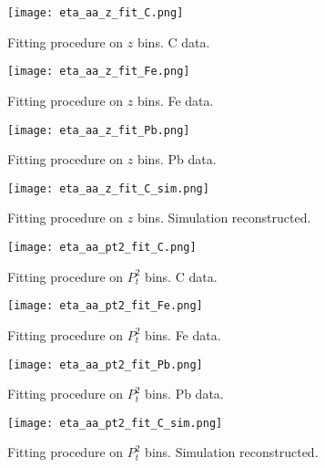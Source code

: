 \begin{landscape}
\begin{figure}[H]
\centering
\texttt{[image: eta\_aa\_z\_fit\_C.png]}
\caption{Fitting procedure on $z$ bins. C data.}
\label{fig:eta_aa_z_fit_C}
\end{figure}

%
\begin{figure}[H]
\centering
\texttt{[image: eta\_aa\_z\_fit\_Fe.png]}
\caption{Fitting procedure on $z$ bins. Fe data.}
\label{fig:eta_aa_z_fit_Fe}
\end{figure}
%
\begin{figure}[H]
\centering
\texttt{[image: eta\_aa\_z\_fit\_Pb.png]}
\caption{Fitting procedure on $z$ bins. Pb data.}
\label{fig:eta_aa_z_fit_Pb}
\end{figure}
%
\begin{figure}[H]
\centering
\texttt{[image: eta\_aa\_z\_fit\_C\_sim.png]}
\caption{Fitting procedure on $z$ bins. Simulation reconstructed.}
\label{fig:eta_aa_z_fit_sim}
\end{figure}


\begin{figure}[H]
\centering
\texttt{[image: eta\_aa\_pt2\_fit\_C.png]}
\caption{Fitting procedure on $P_t^2$ bins. C data.}
\label{fig:eta_aa_pt2_fit_C}
\end{figure}

%
\begin{figure}[H]
\centering
\texttt{[image: eta\_aa\_pt2\_fit\_Fe.png]}
\caption{Fitting procedure on $P_t^2$ bins. Fe data.}
\label{fig:eta_aa_pt2_fit_Fe}
\end{figure}
%
\begin{figure}[H]
\centering
\texttt{[image: eta\_aa\_pt2\_fit\_Pb.png]}
\caption{Fitting procedure on $P_t^2$ bins. Pb data.}
\label{fig:eta_aa_pt2_fit_Pb}
\end{figure}
%
\begin{figure}[H]
\centering
\texttt{[image: eta\_aa\_pt2\_fit\_C\_sim.png]}
\caption{Fitting procedure on $P_t^2$ bins. Simulation reconstructed.}
\label{fig:eta_aa_pt2_fit_sim}
\end{figure}


\end{landscape}
